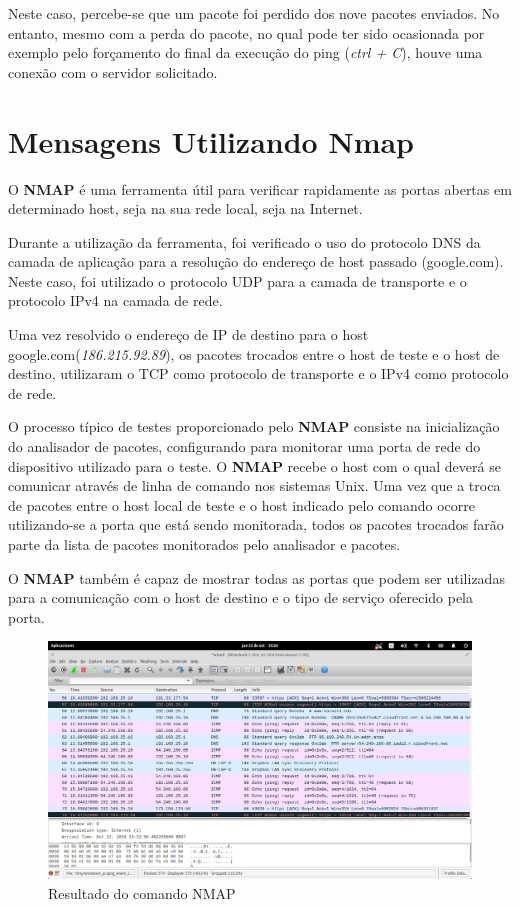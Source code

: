 Neste caso, percebe-se que um pacote foi perdido dos nove pacotes enviados. No entanto, mesmo com a perda do pacote, no qual pode ter sido ocasionada por exemplo pelo forçamento do final da execução do ping (\emph{ctrl + C}), houve uma conexão com o servidor solicitado.


\section{Mensagens Utilizando Nmap}

O \textbf{NMAP} é uma ferramenta útil para verificar rapidamente as portas abertas em determinado host, seja na sua rede local, seja na Internet.

Durante a utilização da ferramenta, foi verificado o uso do protocolo DNS da camada de aplicação para a resolução do endereço de host passado (google.com). Neste caso, foi utilizado o protocolo UDP para a camada de transporte e o protocolo IPv4 na camada de rede.

Uma vez resolvido o endereço de IP de destino para o host google.com(\emph{186.215.92.89}), os pacotes trocados entre o host de teste e o host de destino, utilizaram o TCP como protocolo de transporte e o IPv4 como protocolo de rede.

O processo típico de testes proporcionado pelo \textbf{NMAP} consiste na inicialização do analisador de pacotes, configurando­ para monitorar uma porta de rede do dispositivo utilizado para o teste. O \textbf{NMAP} recebe o host com o qual deverá se comunicar através de linha de comando nos sistemas Unix. Uma vez que a troca de pacotes entre o host local de teste e o host indicado pelo comando ocorre utilizando­-se a porta que está sendo monitorada, todos os pacotes trocados farão parte da lista de pacotes monitorados pelo analisador e pacotes.

O \textbf{NMAP} também é capaz de mostrar todas as portas que podem ser utilizadas para a comunicação com o host de destino e o tipo de serviço oferecido pela porta.

\begin{figure}[h]
    \centering

    \includegraphics[width=450px, scale=1]{figuras/ping}
    \caption{Resultado do comando NMAP}

 \label{fig:nmap}
  \end{figure}

